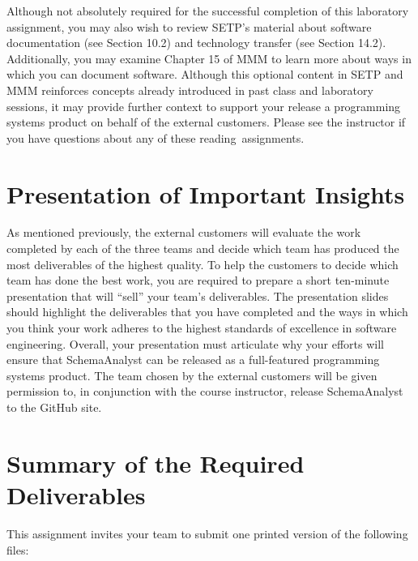 Although not absolutely required for the successful completion of this laboratory assignment, you may also wish to
review SETP's material about software documentation (see Section 10.2) and technology transfer (see Section 14.2).
Additionally, you may examine Chapter 15 of MMM to learn more about ways in which you can document software. Although
this optional content in SETP and MMM reinforces concepts already introduced in past class and laboratory sessions, it
may provide further context to support your release a programming systems product on behalf of the external customers.
Please see the instructor if you have questions about any of these \mbox{reading assignments}.

\section*{Presentation of Important Insights}

As mentioned previously, the external customers will evaluate the work completed by each of the three teams and decide
which team has produced the most deliverables of the highest quality. To help the customers to decide which team has
done the best work, you are required to prepare a short ten-minute presentation that will ``sell'' your team's
deliverables. The presentation slides should highlight the deliverables that you have completed and the ways in which
you think your work adheres to the highest standards of excellence in software engineering. Overall, your presentation
must articulate why your efforts will ensure that SchemaAnalyst can be released as a full-featured programming systems
product. The team chosen by the external customers will be given permission to, in conjunction with the course
instructor, release SchemaAnalyst to the GitHub site.

\section*{Summary of the Required Deliverables}

This assignment invites your team to submit one printed version of the following files:

